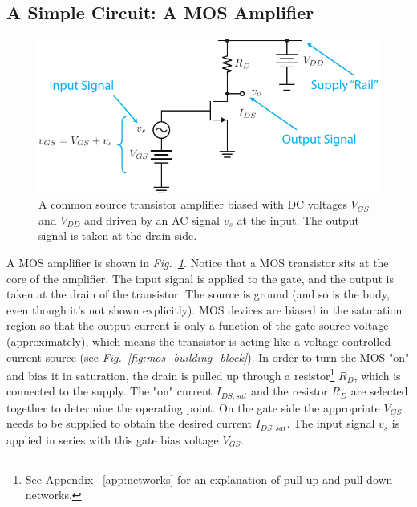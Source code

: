 \subsection{A Simple Circuit: A MOS Amplifier}
\begin{figure}[tb]
\centering
\includegraphics[width=.75\columnwidth]{csamp_signals}
\caption{A common source transistor amplifier biased with DC voltages $V_{GS}$ and $V_{DD}$ and driven by an AC signal $v_s$ at the input.  The output signal is taken at the drain side.}
\label{fig:csamp_signals}
\end{figure}
A MOS amplifier is shown in \emph{Fig.~\ref{fig:csamp_signals}}.  Notice that a MOS transistor sits at the core of the amplifier.  The input signal is applied to the gate, and the output is taken at the drain of the transistor.  The source is ground (and so is the body, even though it's not shown explicitly).  MOS devices are biased in the saturation region so that the output current is only a function of the gate-source voltage (approximately), which means the transistor is acting like a voltage-controlled current source (see \emph{Fig.~\ref{fig:mos_building_block}}).  In order to turn the MOS "on" and bias it in saturation, the drain is pulled up through a resistor\footnote{See Appendix ~\ref{app:networks} for an explanation of pull-up and pull-down networks.} $R_D$, which is connected to the supply.  The "on" current $I_{DS,sat}$ and the resistor $R_D$ are selected together to determine the operating point.  On the gate side the appropriate $V_{GS}$ needs to be supplied to obtain the desired current $I_{DS,sat}$.  The input signal $v_{s}$ is applied in series with this gate bias voltage $V_{GS}$.
